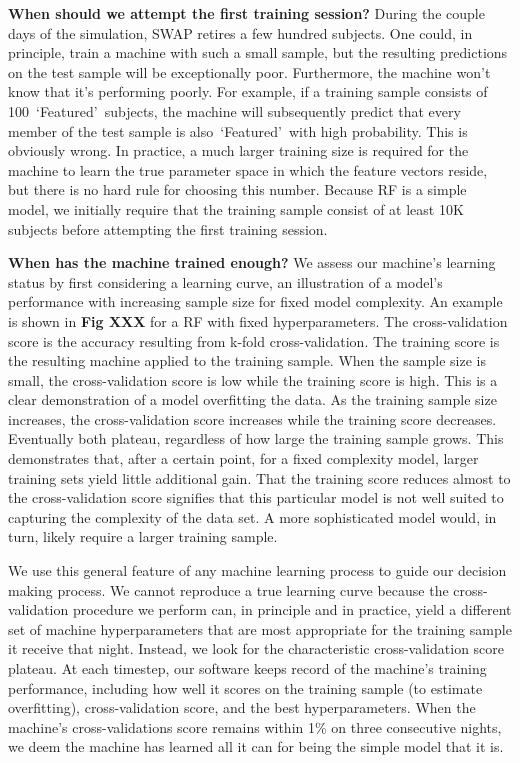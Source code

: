 \documentclass[twocolumn]{aastex6}
\newcommand{\feat}{`Featured'}
\begin{document}
\textbf{When should we attempt the first training session?}
During the couple days of the simulation, SWAP retires a few hundred subjects.
One could, in principle, train a machine with such a small sample, but the resulting
predictions on the test sample will be exceptionally poor. Furthermore, the machine
won't know that it's performing poorly. For example, if a training sample consists of
100~\feat~subjects, the machine will subsequently predict that every member of the 
test sample is also~\feat~with high probability. This is obviously wrong. 
In practice, a much larger training size is required for the machine to learn the 
true parameter space in which the feature vectors reside, but there is no hard rule
for choosing this number. Because RF is a simple model, we initially require that 
the training sample consist of at least 10K subjects before attempting the first training session. 

\textbf{When has the machine trained enough?} 
We assess our machine's learning status by first considering a learning curve, 
an illustration of a model's performance with increasing sample size for fixed 
model complexity. An example is shown in \textbf{Fig XXX} 
for a RF with fixed hyperparameters. The cross-validation score is the accuracy
resulting from k-fold cross-validation. The training score is the resulting machine
applied to the training sample. When the sample size is small, the cross-validation
score is low while the training score is high. This is a clear demonstration of a model
overfitting the data. As the training sample size 
increases, the cross-validation score increases while the training score decreases. 
Eventually both plateau, regardless of how large the training sample grows. 
This demonstrates that, after a certain point, for a fixed complexity model, 
larger training sets yield little additional gain. That the training
score reduces almost to the cross-validation score signifies that this particular
model is not well suited to capturing the complexity of the data set. 
A more sophisticated model would, in turn, likely require a larger training
sample. 

We use this general feature of any machine learning process to guide our 
decision making process. We cannot reproduce a true learning curve
because the cross-validation procedure we perform can, in principle and in practice, 
yield a different set of machine hyperparameters that are most appropriate
for the training sample it receive that night.  Instead, we look for the characteristic 
cross-validation score plateau. At each timestep, our software keeps record of 
the machine's training performance, including how well it scores on the 
training sample (to estimate overfitting), cross-validation score, 
and the best hyperparameters. When the machine's 
cross-validations score remains within 1\% on three consecutive nights, 
we deem the machine has learned all it can for being the simple model that it is. 
\end{document}
